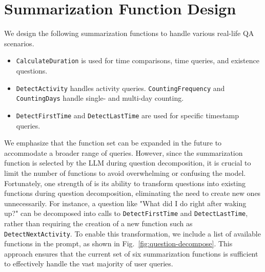 \section{Summarization Function Design}
\label{sec:query-function}

We design the following summarization functions to handle various real-life QA scenarios.
\begin{itemize}
    \item \texttt{CalculateDuration} is used for time comparisons, time queries, and existence questions.
    \item \texttt{DetectActivity} handles activity queries. \texttt{CountingFrequency} and \texttt{CountingDays} handle single- and multi-day counting. 
    \item \texttt{DetectFirstTime} and \texttt{DetectLastTime} are used for specific timestamp queries.
\end{itemize}
We emphasize that the function set can be expanded in the future to accommodate a broader range of queries.
However, since the summarization function is selected by the LLM during question decomposition, it is crucial to limit the number of functions to avoid overwhelming or confusing the model.
Fortunately, one strength of \Method is its ability to transform questions into existing functions during question decomposition, eliminating the need to create new ones unnecessarily.
For instance, a question like "What did I do right after waking up?" can be decomposed into calls to \texttt{DetectFirstTime} and \texttt{DetectLastTime}, rather than requiring the creation of a new function such as \texttt{DetectNextActivity}.
To enable this transformation, we include a list of available functions in the prompt, as shown in Fig.~\ref{fig:question-decompose}.
This approach ensures that the current set of six summarization functions is sufficient to effectively handle the vast majority of user queries.


